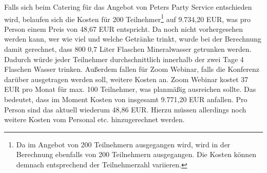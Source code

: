 Falls sich beim Catering für das Angebot von Peters Party Service entschieden wird, belaufen sich die Kosten für 200 Teilnehmer\footnote{Da im Angebot von 200 Teilnehmern ausgegangen wird, wird in der Berechnung ebenfalls von 200 Teilnehmern ausgegangen. Die Kosten können demnach entsprechend der Teilnehmerzahl variieren.} auf 9.734,20 EUR, was pro Person einem Preis von 48,67 EUR entspricht. Da noch nicht vorhergesehen werden kann, wer wie viel und welche Getränke trinkt, wurde bei der Berechnung damit gerechnet, dass 800 0,7 Liter Flaschen Mineralwasser getrunken werden. Dadurch würde jeder Teilnehmer durchschnittlich innerhalb der zwei Tage 4 Flaschen Wasser trinken. Außerdem fallen für Zoom Webinar, falls die Konferenz darüber ausgetragen werden soll, weitere Kosten an. Zoom Webinar kostet 37 EUR pro Monat für max. 100 Teilnehmer, was planmäßig ausreichen sollte. Das bedeutet, dass im Moment Kosten von insgesamt 9.771,20 EUR anfallen. Pro Person sind das aktuell wiederum 48,86 EUR. Hierzu müssen allerdings noch weitere Kosten vom Personal etc. hinzugerechnet werden.

